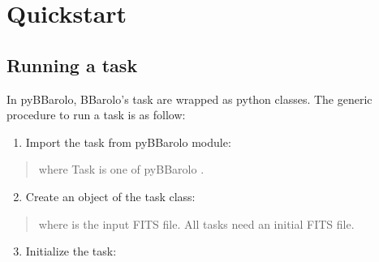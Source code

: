 \documentclass[letterpaper,10pt,english]{sphinxmanual}
\begin{document}
\chapter{Quickstart}
\label{\detokenize{pybb_quickstart::doc}}\label{\detokenize{pybb_quickstart:quickstart}}

\section{Running a task}
\label{\detokenize{pybb_quickstart:running-a-task}}
In pyBBarolo, BBarolo’s task are wrapped as python classes. The generic procedure to run a task is as follow:
\begin{enumerate}
\item {} 
Import the task from pyBBarolo module:

\begin{sphinxVerbatim}[commandchars=\\\{\}]
   
\end{sphinxVerbatim}

\end{enumerate}
\begin{quote}

where Task is one of pyBBarolo {\hyperref[\detokenize{pybb_quickstart:pybbtasks}]{}}.
\end{quote}
\begin{enumerate}
\setcounter{enumi}{1}
\item {} 
Create an object of the task class:

\begin{sphinxVerbatim}[commandchars=\\\{\}]
  
\end{sphinxVerbatim}

\end{enumerate}
\begin{quote}

where  is the input FITS file. All tasks need an initial FITS file.
\end{quote}
\begin{enumerate}
\setcounter{enumi}{2}
\item {} 
Initialize the task:

\begin{sphinxVerbatim}[commandchars=\\\{\}]
\end{sphinxVerbatim}

\end{enumerate}
\end{document}
